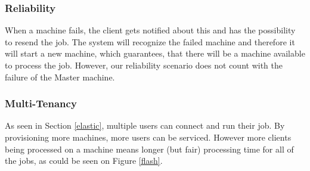 \subsubsection{Reliability}
When a machine fails, the client gets notified about this and has the possibility to resend the job. The system will recognize the failed machine and therefore it will start a new machine, which guarantees, that there will be a machine available to process the job. However, our reliability scenario does not count with the failure of the Master machine.

\subsubsection{Multi-Tenancy}
As seen in Section \ref{elastic}, multiple users can connect and run their job. By provisioning more machines, more users can be serviced. However more clients being processed on a machine means longer (but fair) processing time for all of the jobs, as could be seen on Figure \ref{flash}.